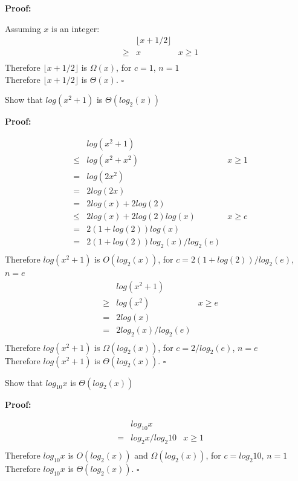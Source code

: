 \documentclass{article}
\newenvironment{proof}
{\color{PineGreen}\begin{list}{}%
         {\setlength{\leftmargin}{1cm}}%
         \item[]%
        \textbf{Proof:}
        
        }
{ $\square$\end{list}}
\begin{document}
\begin{enumerate}[label=\alph{enumi})]
\begin{proof}
Assuming $x$ is an integer:
\[\begin{array}{rclr}
&&\lfloor x + 1/2 \rfloor&\\
&\geq& x	&	x\geq 1\\
\end{array}\]
Therefore $\lfloor x + 1/2 \rfloor$ is $\Omega(x)$, for $c=1$, $n=1$\\
Therefore $\lfloor x + 1/2 \rfloor$ is $\Theta (x)$.
\end{proof}
\item Show that $log(x^2+1)$ is $\Theta (log_2(x))$
\begin{proof}
\[\begin{array}{rclr}
&&log(x^2+1)&\\
&\leq&log(x^2 + x^2) & x \geq 1 \\
&=&log(2x^2)&\\
&=&2log(2x)&\\
&=&2log(x) + 2log(2)&		\\
&\leq&2log(x) + 2log(2)log(x)&	x \geq e \\
&=&2(1 + log(2))log(x)&		\\
&=&2(1 + log(2))log_2(x)/log_2(e)&		\\
\end{array}\]
Therefore $log(x^2+1)$ is $O(log_2(x))$, for $c=2(1+ log(2))/log_2(e)$, $n=e$
\[\begin{array}{rclr}
&&log(x^2+1)&\\
&\geq& log(x^2)	&	x\geq e\\
&=& 2log(x)	&	\\
&=& 2log_2(x)/log_2(e)	&	\\
\end{array}\]
Therefore $log(x^2+1)$ is $\Omega(log_2(x))$, for $c=2/log_2(e)$, $n=e$\\
Therefore $log(x^2+1)$ is $\Theta (log_2(x))$.
\end{proof}
\item Show that $log_{10}x$ is $\Theta (log_2(x))$
\begin{proof}
\[\begin{array}{rclr}
&&log_{10}x&\\
&=&log_{2}x/log_{2}10	&	x \geq 1	\\
\end{array}\]
Therefore $log_{10}x$ is $O(log_2(x))$ and $\Omega(log_2(x))$, for $c=log_{2}10$, $n=1$
Therefore $log_{10}x$ is $\Theta (log_2(x))$.
\end{proof}
\end{enumerate}
\end{document}
